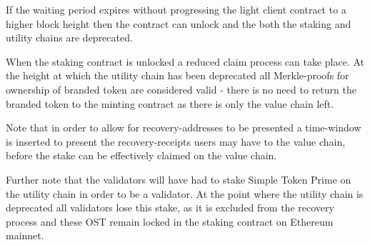 \documentclass[12pt,a4paper, twocolumn]{article}
\begin{document}
If the waiting period expires without progressing the light client contract to a higher block height then the contract can unlock and the both the staking and utility chains are deprecated.\par
When the staking contract is unlocked a reduced claim process can take place.  At the height at which the utility chain has been deprecated all Merkle-proofs for ownership of branded token are considered valid - there is no need to return the branded token to the minting contract as there is only the value chain left. \par
Note that in order to allow for recovery-addresses to be presented a time-window is inserted to present the recovery-receipts users may have to the value chain, before the stake can be effectively claimed on the value chain. \par
Further note that the validators will have had to stake Simple Token Prime on the utility chain in order to be a validator.  At the point where the utility chain is deprecated all validators lose this stake, as it is excluded from the recovery process and these OST remain locked in the staking contract on Ethereum mainnet. \par
\end{document}
